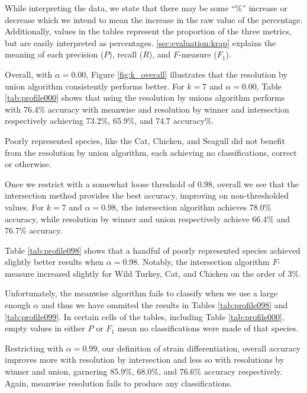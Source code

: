 While interpreting the data, we state that there may be some ``\%'' increase or decrease which we intend to mean the increase in the raw value of the percentage.
Additionally, values in the tables represent the proportion of the three metrics, but are easily interpreted as percentages.
\autoref{sec:evaluation:krap} explains the meaning of each precision ($P$), recall ($R$), and $F$-measure ($F_1$).


Overall, with $\alpha=0.00$, Figure \ref{fig:k_overall} illustrates that the resolution by union algorithm consistently performs better. For $k=7$ and $\alpha = 0.00$, Table \ref{tab:profile000} shows that using the resolution by unions algorithm performs with 76.4\% accuracy with meanwise and resolution by winner and intersection respectively achieving 73.2\%, 65.9\%, and 74.7 accuracy\%.

Poorly represented species, like the Cat, Chicken, and Seagull did not benefit from the resolution by union algorithm, each achieving no classifications, correct or otherwise.


Once we restrict with a somewhat loose threshold of 0.98, overall we see that the intersection method provides the best accuracy, improving on non-thresholded values. For $k=7$ and $\alpha=0.98$, the intersection algorithm achieves 78.0\% accuracy, while resolution by winner and union respectively achieve 66.4\% and 76.7\% accuracy.

Table \ref{tab:profile098} shows that a handful of poorly represented species achieved slightly better results when $\alpha=0.98$. Notably, the intersection algorithm $F$-measure increased slightly for Wild Turkey, Cat, and Chicken on the order of 3\%.

Unfortunately, the meanwise algorithm fails to classify when we use a large enough $\alpha$ and thus we have ommited the results in Tables \ref{tab:profile098} and \ref{tab:profile099}. In certain cells of the tables, including Table \ref{tab:profile000}, empty values in either $P$ or $F_1$ mean no classifications were made of that species.




Restricting with $\alpha=0.99$, our definition of strain differentiation, overall accuracy improves more with resolution by intersection and less so with resolutions by winner and union, garnering 85.9\%, 68.0\%, and 76.6\% accuracy respectively. Again, meanwise resolution fails to produce any classifications.


